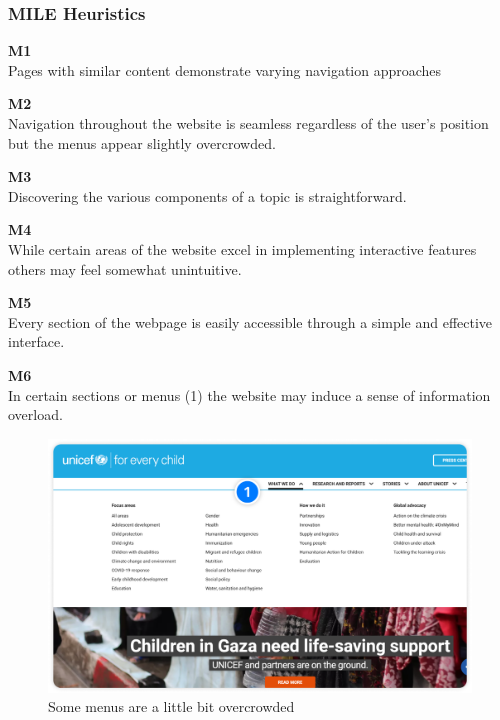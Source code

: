 \subsubsection{MILE Heuristics}
\begin{description}
    \item {\textbf{M1} \color{unicefGray}{Interaction consistency}}\\
    Pages with similar content demonstrate varying navigation approaches
    \item {\textbf{M2} \color{unicefGray}{Group navigation}}\\
    Navigation throughout the website is seamless regardless of the user's position but the menus appear slightly overcrowded.
    \item {\textbf{M3} \color{unicefGray}{Navigation support}}\\
    Discovering the various components of a topic is straightforward.
    \item {\textbf{M4} \color{unicefGray}{User control}}\\
    While certain areas of the website excel in implementing interactive features others may feel somewhat unintuitive.
    \item {\textbf{M5} \color{unicefGray}{Error prevention}}\\
    Every section of the webpage is easily accessible through a simple and effective interface.
    \item {\textbf{M6} \color{unicefGray}{Information overload}}\\
    In certain sections or menus (1) the website may induce a sense of information overload.
    \begin{figure}[h]
        \centering
        \includegraphics[scale=0.20]{Resources/Dario/menu}
        \caption{Some menus are a little bit overcrowded}

\end{figure}
\end{description}
